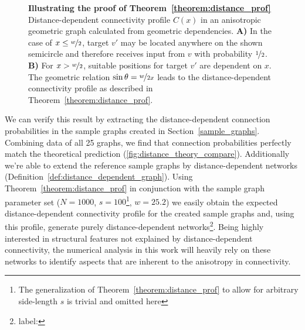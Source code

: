 \vspace{0.2cm}%
\begin{figure}[H] 
  \centering 
  \caption{\textbf{Illustrating the proof of
      Theorem~\ref{theorem:distance_prof}} Distance-dependent
    connectivity profile $C(x)$ in an anisotropic geometric graph
    calculated from geometric dependencies. \textbf{A)} In the case of
    $x\leq \nicefrac{w}{2}$, target $v'$ may be located anywhere on the
    shown semicircle and therefore receives input from $v$ with
    probability $\nicefrac{1}{2}$. \textbf{B)} For $x > \nicefrac{w}{2}$,
    suitable positions for target $v'$ are dependent on $x$. The
    geometric relation $\sin \theta = \nicefrac{w}{2x}$ leads to the
    distance-dependent connectivity profile as described in
    Theorem~\ref{theorem:distance_prof}.}
  \label{fig:geomtr_prb}
\end{figure}


We can verify this result by extracting the distance-dependent
connection probabilities in the sample graphs created in
Section~\ref{sample_graphs}. Combining data of all 25 graphs, we find
that connection probabilities perfectly match the theoretical
prediction (\autoref{fig:distance_theory_compare}). Additionally we're
%
\label{distance_dependent_sample}%
able to extend the reference sample graphs by distance-dependent
networks (Definition~\ref{def:distance_dependent_graph}). Using
Theorem~\ref{theorem:distance_prof} in conjunction with the sample
graph parameter set ($N=1000$, $s=100$\footnote{The generalization of
  Theorem~\ref{theorem:distance_prof} to allow for arbitrary
  side-length $s$ is trivial and omitted here}, $w=25.2$) we easily
obtain the expected distance-dependent connectivity profile for the
created sample graphs and, using this profile, generate purely
distance-dependent networks\footnote{label:
  }. Being
highly interested in structural features not explained by
distance-dependent connectivity, the numerical analysis in this work
will heavily rely on these networks to identify aspects that are
inherent to the anisotropy in connectivity.

